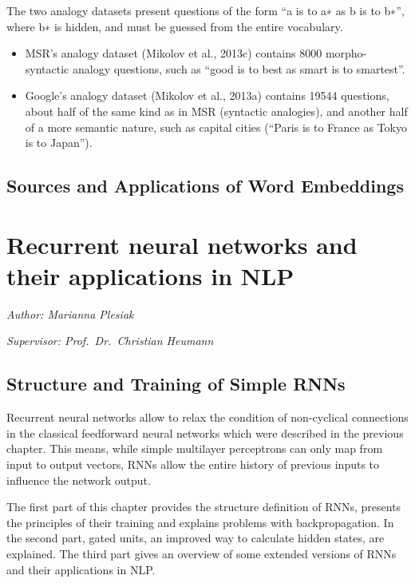 \documentclass[]{krantz}
\providecommand{\tightlist}{%
  \setlength{\itemsep}{0pt}\setlength{\parskip}{0pt}}
\begin{document}
The two analogy datasets present questions of the form ``a is to a∗ as b is to b∗'', where b∗ is hidden, and must be guessed from the entire vocabulary.

\begin{itemize}
\tightlist
\item
  MSR's analogy dataset (Mikolov et al., 2013c) contains 8000 morpho-syntactic analogy questions, such as ``good is to best as smart is to smartest''.
\item
  Google's analogy dataset (Mikolov et al., 2013a) contains 19544 questions, about half of the same kind as in MSR (syntactic analogies), and another half of a more semantic nature, such as capital cities (``Paris is to France as Tokyo is to Japan'').
\end{itemize}

\hypertarget{sources-and-applications-of-word-embeddings}{%
\section{Sources and Applications of Word Embeddings}\label{sources-and-applications-of-word-embeddings}}

\hypertarget{recurrent-neural-networks-and-their-applications-in-nlp}{%
\chapter{Recurrent neural networks and their applications in NLP}\label{recurrent-neural-networks-and-their-applications-in-nlp}}

\emph{Author: Marianna Plesiak}

\emph{Supervisor: Prof.~Dr.~Christian Heumann}

\hypertarget{structure-and-training-of-simple-rnns}{%
\section{Structure and Training of Simple RNNs}\label{structure-and-training-of-simple-rnns}}

Recurrent neural networks allow to relax the condition of non-cyclical connections in the classical feedforward neural networks which were described in the previous chapter. This means, while simple multilayer perceptrons can only map from input to output vectors, RNNs allow the entire history of previous inputs to influence the network output. \citep{graves2013generating}

The first part of this chapter provides the structure definition of RNNs, presents the principles of their training and explains problems with backpropagation. In the second part, gated units, an improved way to calculate hidden states, are explained. The third part gives an overview of some extended versions of RNNs and their applications in NLP.
\end{document}
